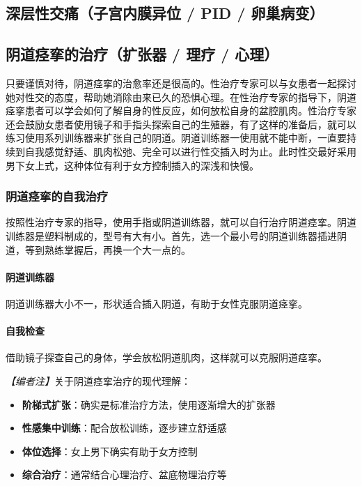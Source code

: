 \begin{enumerate}
\subsection{深层性交痛（子宫内膜异位 / PID / 卵巢病变）}
\subsection{阴道痉挛的治疗（扩张器 / 理疗 / 心理）}

只要谨慎对待，阴道痉挛的治愈率还是很高的。性治疗专家可以与女患者一起探讨她对性交的态度，帮助她消除由来已久的恐惧心理。在性治疗专家的指导下，阴道痉挛患者可以学会如何了解自身的性反应，如何放松自身的盆腔肌肉。性治疗专家还会鼓励女患者使用镜子和手指头探索自己的生殖器，有了这样的准备后，就可以练习使用系列训练器来扩张自己的阴道。阴道训练器一使用就不能中断，一直要持续到自我感觉舒适、肌肉松弛、完全可以进行性交插入时为止。此时性交最好采用男下女上式，这种体位有利于女方控制插入的深浅和快慢。

\subsubsection{阴道痉挛的自我治疗}

按照性治疗专家的指导，使用手指或阴道训练器，就可以自行治疗阴道痉挛。阴道训练器是塑料制成的，型号有大有小。首先，选一个最小号的阴道训练器插进阴道，等到熟练掌握后，再换一个大一点的。

\paragraph{阴道训练器}

阴道训练器大小不一，形状适合插入阴道，有助于女性克服阴道痉挛。

\paragraph{自我检查}

借助镜子探查自己的身体，学会放松阴道肌肉，这样就可以克服阴道痉挛。

\noindent\textit{【编者注】}关于阴道痉挛治疗的现代理解：
\begin{itemize}
	\item \textbf{阶梯式扩张}：确实是标准治疗方法，使用逐渐增大的扩张器
	\item \textbf{性感集中训练}：配合放松训练，逐步建立舒适感
	\item \textbf{体位选择}：女上男下确实有助于女方控制
	\item \textbf{综合治疗}：通常结合心理治疗、盆底物理治疗等
\end{itemize}


\end{enumerate}

